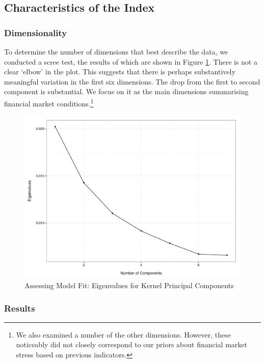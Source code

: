 \documentclass[]{article}
\let\rmarkdownfootnote\footnote%
\def\footnote{\protect\rmarkdownfootnote}
\begin{document}
\subsection{Characteristics of the
Index}\label{characteristics-of-the-index}

\subsubsection{Dimensionality}\label{dimensionality}

To determine the number of dimensions that best describe the data, we
conducted a scree test, the results of which are shown in Figure
\ref{scree_plot}. There is not a clear `elbow' in the plot. This
suggests that there is perhaps substantively meaningful variation in the
first six dimensions. The drop from the first to second component is
substantial. We focus on it as the main dimensions summarising financial
market conditions.\footnote{We also examined a number of the other
  dimensions. However, these noticeably did not closely correspond to
  our priors about financial market stress based on previous indicators.}

\begin{figure}
    \caption{Assessing Model Fit: Eigenvalues for Kernel Principal Components}
    \label{scree_plot}
    \begin{center}
        \includegraphics[scale=0.5]{analysis/figures/scree_plot.pdf}
    \end{center}
\end{figure}

\subsubsection{Results}\label{results}
\end{document}

